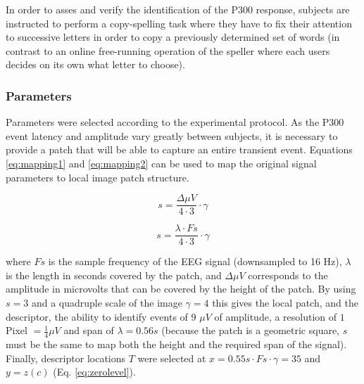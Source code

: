 \documentclass[entropy,article,submit,moreauthors,pdftex,10pt,a4paper]{mdpi}
\begin{document}
In order to asses and verify the identification of the P300 response, subjects are instructed to perform a copy-spelling task where they have to fix their attention to successive letters in order to copy a previously determined set of words (in contrast to an online free-running operation of the speller where each users decides on its own what letter to choose).

\subsubsection{Parameters}

Parameters were selected according to the experimental protocol. As the P300 event latency and amplitude vary greatly between subjects, it is necessary to provide a patch that will be able to capture an entire transient event.  Equations \ref{eq:mapping1} and \ref{eq:mapping2} can be used to map the original signal parameters to local image patch structure. 

\begin{equation}
s= \frac{\Delta \mu V}{4 \cdot 3} \cdot \gamma 
\label{eq:mapping1}
\end{equation}

\begin{equation}
s = \frac{\lambda \cdot Fs}{4 \cdot 3} \cdot \gamma
\label{eq:mapping2}
\end{equation}

\noindent where $ Fs $ is the sample frequency of the EEG signal (downsampled to 16 Hz), $ \lambda $ is the length in seconds covered by the patch, and $\Delta  \mu V $ corresponds to the amplitude in microvolts that can be covered by the height of the patch. By using $ s = 3 $ and a quadruple scale of the image $ \gamma = 4 $ this gives the local patch, and the descriptor, the ability to identify events of 9 $ \mu V $ of amplitude, a resolution of $ 1 $ Pixel $ = \frac{1}{4} \mu V $ and span   of $ \lambda = 0.56 s $ (because the patch is a geometric square, $ s $ must be the same to map both the height and the required span of the signal).  Finally, descriptor locations $ T $ were selected at $ x =  0.55 s \cdot Fs \cdot \gamma = 35 $ and $ y = z(c) $ (Eq. \ref{eq:zerolevel}).
\end{document}

